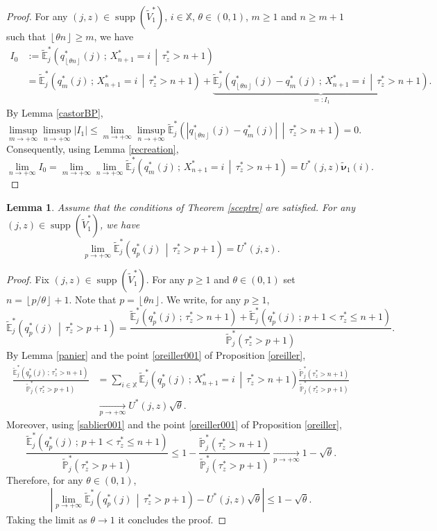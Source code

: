 \documentclass[12pt]{amsart}
\newtheorem{lemma}[theorem]{Lemma}
\theoremstyle{definition}
\numberwithin{equation}{section}
\newcommand*{\abs}[1]{\left\lvert#1\right\rvert}
\newcommand*{\pent}[1]{\left\lfloor#1\right\rfloor}
\newcommand*{\sachant}[2]{\left.#1 \,\middle|\,#2\right.}
\def\bb#1{\mathbb{#1}}
\def\tt#1{\tilde{#1}}
\def\tbs#1{\tilde{\boldsymbol{#1}}}
\def\tbb#1{\tilde{\mathbb{#1}}}
\def\geq{\geqslant}
\def\leq{\leqslant}
\DeclareMathOperator{\supp}{supp}
\begin{document}
\begin{proof}
For any $(j,z) \in \supp(\tt V_1^*)$, $i \in \bb X$, $\theta \in (0,1)$, $m \geq 1$ and $n \geq m+1$ such that $\pent{\theta n} \geq m$, we have
\begin{align*}
I_0 &:= \tbb E_j^* \left( \sachant{ q_{\pent{\theta n}}^*(j) \,;\, X_{n+1}^* = i }{ \tau_z^* > n+1 } \right) \\
&= \tbb E_j^* \left( \sachant{ q_m^*(j) \,;\, X_{n+1}^* = i }{ \tau_z^* > n+1 } \right) + \underbrace{\tbb E_j^* \left( \sachant{ q_{\pent{\theta n}}^*(j)-q_m^*(j) \,;\, X_{n+1}^* = i }{ \tau_z^* > n+1 } \right)}_{=:I_1}.
\end{align*}
By Lemma \ref{castorBP},
\[
\limsup_{m\to+\infty} \limsup_{n\to +\infty} \abs{I_1} \leq \lim_{m\to+\infty} \limsup_{n\to +\infty} \tbb E_j^* \left( \sachant{ \abs{q_{\pent{\theta n}}^*(j)-q_m^*(j)} }{ \tau_z^* > n+1 } \right) = 0.
\]
Consequently, using Lemma \ref{recreation},
\[
\lim_{n\to +\infty} I_0 = \lim_{m\to+\infty} \lim_{n\to +\infty} \tbb E_j^* \left( \sachant{ q_{m}^*(j) \,;\, X_{n+1}^* = i }{ \tau_z^* > n+1 } \right) = U^*(j,z) \tbs \nu_1 (i).
\]
\end{proof}

\begin{lemma} Assume that the conditions of Theorem \ref{sceptre} are satisfied.
\label{osier}
For any $(j,z) \in \supp(\tt V_1^*)$, we have
\[
\lim_{p\to +\infty} \tbb E_j^* \left( \sachant{ q_{p}^*(j) }{ \tau_z^* > p+1 } \right) = U^*(j,z).
\]
\end{lemma}

\begin{proof}
Fix $(j,z) \in \supp(\tt V_1^*)$. For any $p\geq 1$ and $\theta \in (0,1)$ set $n = \pent{p/\theta}+1$.  
Note that $p=\pent{\theta n}$. We write, for any $p \geq 1$,
\[
\tbb E_j^* \left( \sachant{ q_p^*(j) }{ \tau_z^* > p+1 } \right) = \frac{\tbb E_j^* \left( q_p^*(j) \,;\, \tau_z^* > n+1 \right) + \tbb E_j^* \left( q_p^*(j) \,;\, p+1 < \tau_z^* \leq n+1 \right)}{\tbb P_j^* \left( \tau_z^* > p+1 \right)}.
\]
By Lemma \ref{panier} and the point \ref{oreiller001} of Proposition \ref{oreiller},
\begin{align*}
	\frac{\tbb E_j^* \left( q_p^*(j) \,;\, \tau_z^* > n+1 \right)}{\tbb P_j^* \left( \tau_z^* > p+1 \right)} &= \sum_{i\in \bb X} \tbb E_j^* \left( \sachant{ q_p^*(j) \,;\, X_{n+1}^*=i }{ \tau_z^* > n+1 } \right) \frac{\tbb P_j^* \left( \tau_z^* > n+1 \right)}{\tbb P_j^* \left( \tau_z^* > p+1 \right)} \\
	&\underset{p\to+\infty}{\longrightarrow} U^*(j,z) \sqrt{\theta}.
\end{align*}
Moreover, using \eqref{sablier001} and the point \ref{oreiller001} of Proposition \ref{oreiller},
\[
\frac{\tbb E_j^* \left( q_p^*(j) \,;\, p+1 < \tau_z^* \leq n+1 \right)}{\tbb P_j^* \left( \tau_z^* > p+1 \right)} \leq 1- \frac{\tbb P_j^* \left(\tau_z^* > n+1 \right)}{\tbb P_j^* \left( \tau_z^* > p+1 \right)} \underset{p\to+\infty}{\longrightarrow} 1-\sqrt{\theta}.
\]
Therefore, for any $\theta \in (0,1)$,
\[
\abs{\lim_{p\to+\infty} \tbb E_j^* \left( \sachant{ q_p^*(j) }{ \tau_z^* > p+1 } \right) - U^*(j,z) \sqrt{\theta}} \leq 1-\sqrt{\theta}.
\]
Taking the limit as $\theta \to 1$ it concludes the proof.
\end{proof}
\end{document}
